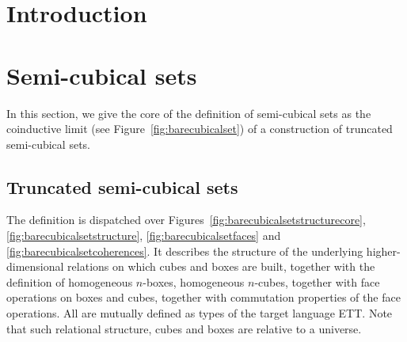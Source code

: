 \documentclass[a4paper,english,cleveref,autoref,thm-restate]{article}
\begin{document}
\newcommand{\reflbox}[1]{\mathsf{reflbox}_{#1}}
\newcommand{\refllayer}[1]{\mathsf{refllayer}_{#1}}
\newcommand{\reflcube}[1]{\mathsf{reflcube}_{#1}}
\newcommand{\permutebox}{\mathsf{permutebox}}
\newcommand{\diagbox}{\mathsf{diagbox}}
\newcommand{\connbox}{\mathsf{connbox}}
\newcommand{\hd}{\mathsf{hd}}
\newcommand{\tl}{\mathsf{tl}}
\newcommand{\first}{\mathsf{first}}
\newcommand{\groupoid}{\mathsf{groupoid}}
\newcommand{\groupoidn}{\mathsf{groupoidn}}
\newcommand{\letinsplit}[3]{\!\!\begin{array}{l}\mathbf{let}~{#1}=#2\;\mathbf{in}~\\#3\end{array}}

\newcommand{\UIP}{\mathsf{UIP}}

\tableofcontents

\section{Introduction}

\section{Semi-cubical sets}
\label{sec:truncated-cubical-sets}

In this section, we give the core of the definition of semi-cubical
sets as the coinductive limit (see Figure~\ref{fig:barecubicalset}) of a
construction of truncated semi-cubical sets.

\subsection{Truncated semi-cubical sets}

The definition is dispatched over
Figures~\ref{fig:barecubicalsetstructurecore},
\ref{fig:barecubicalsetstructure}, \ref{fig:barecubicalsetfaces} and
\ref{fig:barecubicalsetcoherences}. It describes the structure of the
underlying higher-dimensional relations on which cubes and boxes are
built, together with the definition of homogeneous $n$-boxes,
homogeneous $n$-cubes, together with face operations on boxes and
cubes, together with commutation properties of the face
operations. All are mutually defined as types of the target language
ETT. Note that such relational structure, cubes and boxes are relative
to a universe.
\end{document}
